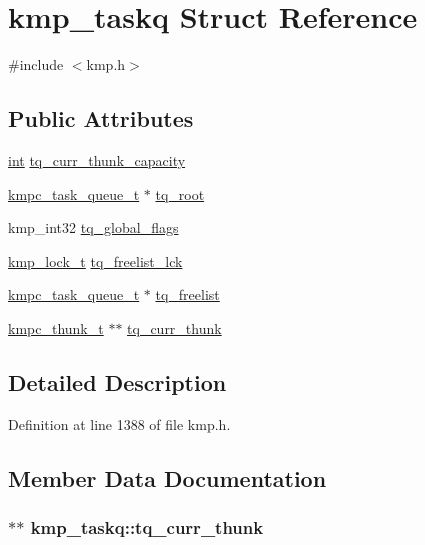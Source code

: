\hypertarget{structkmp__taskq}{\section{kmp\-\_\-taskq Struct Reference}
\label{structkmp__taskq}
}


{\ttfamily \#include $<$kmp.\-h$>$}

\subsection*{Public Attributes}
\begin{DoxyCompactItemize}
\item 
\hyperlink{ittnotify__static_8h_a8b8dcd723308a8cb5d84277c7a3fff70}{int} \hyperlink{structkmp__taskq_a45ff2bfd58b826f09f523dd3d5d94ab3}{tq\-\_\-curr\-\_\-thunk\-\_\-capacity}
\item 
\hyperlink{structkmpc__task__queue__t}{kmpc\-\_\-task\-\_\-queue\-\_\-t} $\ast$ \hyperlink{structkmp__taskq_aafe42b67e85280d38e2e8277428c9cc8}{tq\-\_\-root}
\item 
kmp\-\_\-int32 \hyperlink{structkmp__taskq_a3fcec7effcbdd186e9d731640c643858}{tq\-\_\-global\-\_\-flags}
\item 
\hyperlink{kmp__lock_8h_ad1928c8c2d45f7848000a372ec4fde54}{kmp\-\_\-lock\-\_\-t} \hyperlink{structkmp__taskq_acf4e08b3b0ca30ca153287feb367a336}{tq\-\_\-freelist\-\_\-lck}
\item 
\hyperlink{structkmpc__task__queue__t}{kmpc\-\_\-task\-\_\-queue\-\_\-t} $\ast$ \hyperlink{structkmp__taskq_ac7600293c9ae3cc94e5228d1c6e53733}{tq\-\_\-freelist}
\item 
\hyperlink{structkmpc__thunk__t}{kmpc\-\_\-thunk\-\_\-t} $\ast$$\ast$ \hyperlink{structkmp__taskq_af8f4729d7137de047eaa16ccf1481791}{tq\-\_\-curr\-\_\-thunk}
\end{DoxyCompactItemize}


\subsection{Detailed Description}


Definition at line 1388 of file kmp.\-h.



\subsection{Member Data Documentation}
\hypertarget{structkmp__taskq_af8f4729d7137de047eaa16ccf1481791}{
\subsubsection[{tq\-\_\-curr\-\_\-thunk}]{$\ast$$\ast$ kmp\-\_\-taskq\-::tq\-\_\-curr\-\_\-thunk}}\label{structkmp__taskq_af8f4729d7137de047eaa16ccf1481791}


